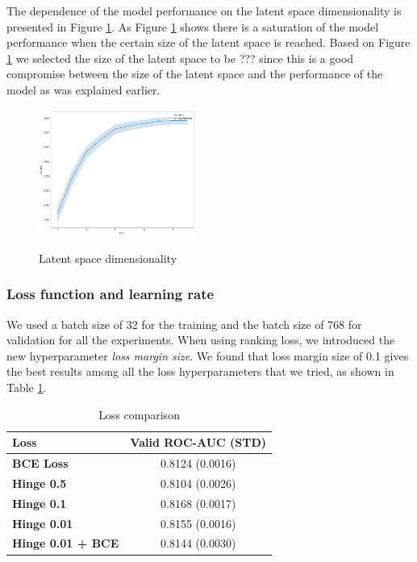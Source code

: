 \documentclass[sigconf]{acmart}
\begin{document}
The dependence of the model performance on the latent space dimensionality is presented in Figure \ref{fig-lat}. As Figure \ref{fig-lat} shows there is a saturation of the model performance when the certain size of the latent space is reached. Based on Figure \ref{tab-loss} we selected the size of the latent space to be ??? since this is a good compromise between the size of the latent space and the performance of the model as was explained earlier.

\begin{figure}[ht]
  \caption{Latent space dimensionality}
  \includegraphics[width=0.46\textwidth]{latent-pic.png}
  \label{fig-lat}
\end{figure}

\subsubsection{Loss function and learning rate}

We used a batch size of 32 for the training and the batch size of 768 for validation for all the experiments. When using ranking loss, we introduced the new hyperparameter \textit{loss margin size}. We found that loss margin size of 0.1 gives the best results among all the loss hyperparameters that we tried, as shown in Table \ref{tab-loss}. 

\begin{table}[ht]
\caption{Loss comparison}
\begin{tabular}{ | l | c |  }
\hline
\textbf{Loss} & \textbf{Valid ROC-AUC (STD)} \\
\hline
\textbf{BCE Loss} & 0.8124 (0.0016)  \\
\textbf{Hinge 0.5} & 0.8104 (0.0026)  \\
\textbf{Hinge 0.1} & 0.8168 (0.0017)  \\
\textbf{Hinge 0.01} & 0.8155 (0.0016)  \\
\textbf{Hinge 0.01 + BCE} & 0.8144 (0.0030)  \\
\hline
\end{tabular}
\label{tab-loss}
\end{table}
\end{document}
